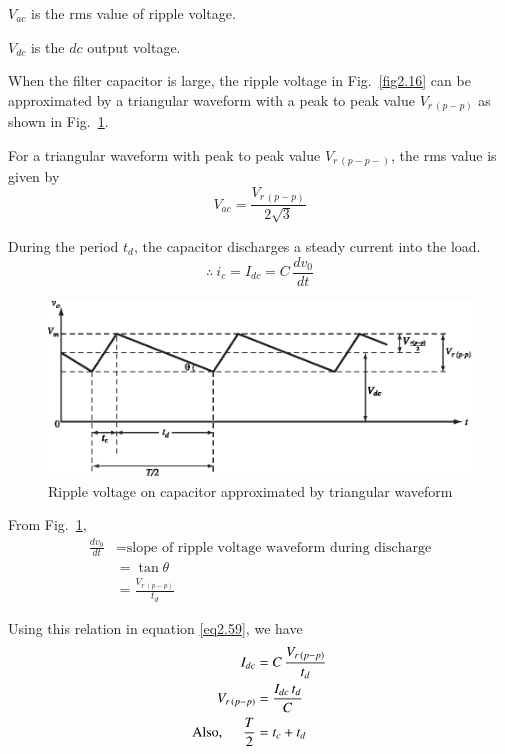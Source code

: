 $V_{ac}$ is the rms value of ripple voltage.

$V_{dc}$ is the $dc$ output voltage.

When the filter capacitor is large, the ripple voltage in Fig.~\ref{fig2.16}
can be approximated by a triangular waveform with a peak to peak value
$V_{r\,(p-p)}$ as shown in Fig.~\ref{fig2.19}.


For a triangular waveform with peak to peak value $V_{r\,(p-p-)}$, the
rms value is given by 
\begin{equation}
V_{ac} = \frac{V_{r\,(p-p)}}{2 \sqrt{3}} \label{eq2.58}
\end{equation}

During the period $t_d$, the capacitor discharges a steady current
into the load.
\begin{equation}
\therefore ~ i_c = I_{dc} = C\, \frac{dv_0}{dt}  \label{eq2.59}
\end{equation}
\begin{figure}[H]
\centering
\includegraphics{chap2/add-fig/S3-EE-02-019.eps}
\caption{Ripple voltage on capacitor approximated by triangular waveform}\label{fig2.19}
\end{figure}

From Fig.~\ref{fig2.19},
\begin{align*}
\frac{dv_0}{dt} & = \text{slope of ripple voltage waveform during
  discharge}\\
& = \tan \theta \\
& = \frac{V_{r\,(p-p)}}{t_d}
\end{align*}

Using this relation in equation \eqref{eq2.59}, we have
\begin{align}
I_{dc} & = C\, \frac{V_{r\,(p-p)}}{t_d} \notag\\
V_{r\,(p-p)} & = \frac{I_{dc}\,t_d}{C} \label{eq2.60}\\
\text{Also, \ } \quad \frac{T}{2} & = t_c + t_d \label{eq2.61}
\end{align}

